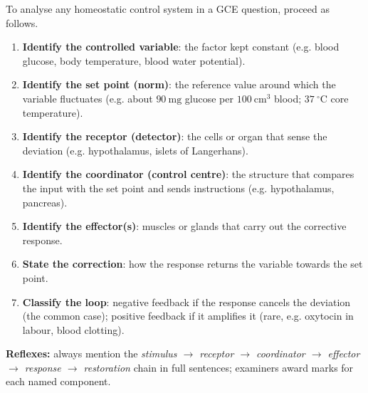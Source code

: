 \documentclass[11pt]{article}
\newcommand{\cle}[1]{{\popxbold\color{popdark}#1}}
\begin{document}
\begin{methode}
To analyse any homeostatic control system in a GCE question, proceed as follows.
\begin{enumerate}
\item \textbf{Identify the controlled variable}: the factor kept constant (e.g. blood glucose, body temperature, blood water potential).
\item \textbf{Identify the set point (norm)}: the reference value around which the variable fluctuates (e.g. about $90\ \mathrm{mg}$ glucose per $100\ \mathrm{cm}^3$ blood; $37\ ^\circ\mathrm{C}$ core temperature).
\item \textbf{Identify the receptor (detector)}: the cells or organ that sense the deviation (e.g. hypothalamus, islets of Langerhans).
\item \textbf{Identify the coordinator (control centre)}: the structure that compares the input with the set point and sends instructions (e.g. hypothalamus, pancreas).
\item \textbf{Identify the effector(s)}: muscles or glands that carry out the corrective response.
\item \textbf{State the correction}: how the response returns the variable towards the set point.
\item \textbf{Classify the loop}: \cle{negative feedback} if the response cancels the deviation (the common case); \cle{positive feedback} if it amplifies it (rare, e.g. oxytocin in labour, blood clotting).
\end{enumerate}
\textbf{Reflexes:} always mention the \emph{stimulus $\rightarrow$ receptor $\rightarrow$ coordinator $\rightarrow$ effector $\rightarrow$ response $\rightarrow$ restoration} chain in full sentences; examiners award marks for each named component.
\end{methode}
\end{document}
